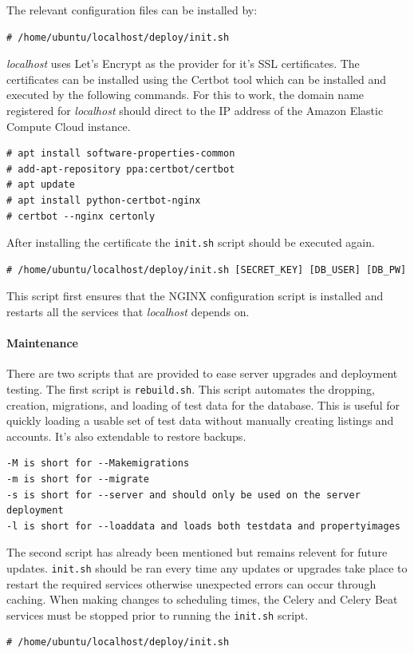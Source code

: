 The relevant configuration files can be installed by:
\begin{lstlisting}
# /home/ubuntu/localhost/deploy/init.sh
\end{lstlisting}
\emph{localhost} uses Let's Encrypt as the provider for it's SSL certificates.
The certificates can be installed using the Certbot tool which can be
installed and executed by the following commands. For this to work, the domain
name registered for \emph{localhost} should direct to the IP address of the
Amazon Elastic Compute Cloud instance.
\begin{lstlisting}
# apt install software-properties-common
# add-apt-repository ppa:certbot/certbot
# apt update
# apt install python-certbot-nginx
# certbot --nginx certonly
\end{lstlisting}
After installing the certificate the \lstinline{init.sh} script should be
executed again.
\begin{lstlisting}
# /home/ubuntu/localhost/deploy/init.sh [SECRET_KEY] [DB_USER] [DB_PW]
\end{lstlisting}
This script first ensures that the NGINX configuration script is installed
and restarts all the services that \emph{localhost} depends on.

\paragraph{Maintenance}

There are two scripts that are provided to ease server upgrades and deployment
testing. The first script is \lstinline{rebuild.sh}. This script automates the
dropping, creation, migrations, and loading of test data for the database.
This is useful for quickly loading a usable set of test data without manually
creating listings and accounts. It's also extendable to restore backups.
\begin{lstlisting}
-M is short for --Makemigrations
-m is short for --migrate
-s is short for --server and should only be used on the server deployment
-l is short for --loaddata and loads both testdata and propertyimages
\end{lstlisting}

The second script has already been mentioned but remains relevent for future
updates. \lstinline{init.sh} should be ran every time any updates or upgrades
take place to restart the required services otherwise unexpected errors can
occur through caching. When making changes to scheduling times, the Celery
and Celery Beat services must be stopped prior to running the
\lstinline{init.sh} script.
\begin{lstlisting}
# /home/ubuntu/localhost/deploy/init.sh
\end{lstlisting}

